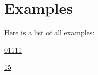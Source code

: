 \section{Examples}
Here is a list of all examples\+:\begin{DoxyCompactItemize}
\item 
\hyperlink{01111-example}{01111}
\item 
\hyperlink{15-example}{15}
\end{DoxyCompactItemize}
